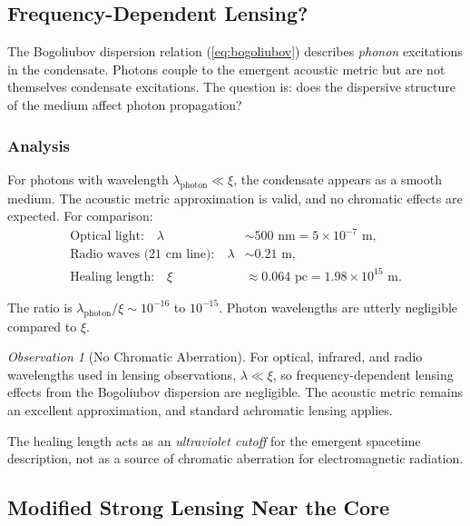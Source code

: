 \documentclass[11pt,a4paper]{article}
\newcommand{\ee}[1]{\times 10^{#1}}
\theoremstyle{definition}
\theoremstyle{remark}
\newtheorem{observation}{Observation}[section]
\begin{document}
\subsection{Frequency-Dependent Lensing?}
\label{sec:chromatic}

The Bogoliubov dispersion relation (\ref{eq:bogoliubov}) describes \emph{phonon} excitations in the condensate. Photons couple to the emergent acoustic metric but are not themselves condensate excitations. The question is: does the dispersive structure of the medium affect photon propagation?

\subsubsection{Analysis}

For photons with wavelength $\lambda_{\mathrm{photon}} \ll \xi$, the condensate appears as a smooth medium. The acoustic metric approximation is valid, and no chromatic effects are expected. For comparison:
\begin{align}
\text{Optical light:} \quad \lambda &\sim 500 \text{ nm} = 5 \ee{-7} \text{ m}, \\
\text{Radio waves (21 cm line):} \quad \lambda &\sim 0.21 \text{ m}, \\
\text{Healing length:} \quad \xi &\approx 0.064 \text{ pc} = 1.98 \ee{15} \text{ m}.
\end{align}

The ratio is $\lambda_{\mathrm{photon}}/\xi \sim 10^{-16}$ to $10^{-15}$. Photon wavelengths are utterly negligible compared to $\xi$.

\begin{observation}[No Chromatic Aberration]
For optical, infrared, and radio wavelengths used in lensing observations, $\lambda \ll \xi$, so frequency-dependent lensing effects from the Bogoliubov dispersion are negligible. The acoustic metric remains an excellent approximation, and standard achromatic lensing applies.
\end{observation}

The healing length acts as an \emph{ultraviolet cutoff} for the emergent spacetime description, not as a source of chromatic aberration for electromagnetic radiation.

\subsection{Modified Strong Lensing Near the Core}
\label{sec:strong_lensing_core}
\end{document}
